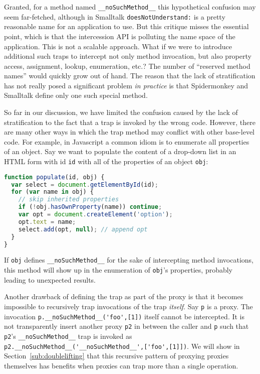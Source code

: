 \documentclass{acm_proc_article-sp}
\newcommand{\noSuchMethod}{\texttt{\_\_noSuchMethod\_\_}}
\begin{document}
Granted, for a method named \noSuchMethod{} this hypothetical confusion may seem far-fetched, although in Smalltalk \texttt{doesNotUnderstand:} is a pretty reasonable name for an application to use. But this critique misses the essential point, which is that the intercession API is polluting the name space of the application. This is not a scalable approach. What if we were to introduce additional such traps to intercept not only method invocation, but also property access, assignment, lookup, enumeration, etc.? The number of ``reserved method names'' would quickly grow out of hand. The reason that the lack of stratification has not really posed a significant problem \emph{in practice} is that Spidermonkey and Smalltalk define only one such special method.

So far in our discussion, we have limited the confusion caused by the lack of stratification to the fact that a trap is invoked by the wrong code. However, there are many other ways in which the trap method may conflict with other base-level code. For example, in Javascript a common idiom is to enumerate all properties of an object. Say we want to populate the content of a drop-down list in an HTML form with id \texttt{id} with all of the properties of an object \texttt{obj}:

\begin{lstlisting}[language=javascript]
function populate(id, obj) {
  var select = document.getElementById(id);
  for (var name in obj) {
    // skip inherited properties
    if (!obj.hasOwnProperty(name)) continue;
    var opt = document.createElement('option');
    opt.text = name;
    select.add(opt, null); // append opt
  }
}
\end{lstlisting}

If \texttt{obj} defines \noSuchMethod{} for the sake of intercepting method invocations, this method will show up in the enumeration of \texttt{obj}'s properties, probably leading to unexpected results.

Another drawback of defining the trap as part of the proxy is that it becomes impossible to recursively trap invocations of the trap \emph{itself}. Say \texttt{p} is a proxy. The invocation \lstinline{p.__noSuchMethod__('foo',[1])} itself cannot be intercepted. It is not transparently insert another proxy \texttt{p2} in between the caller and \texttt{p} such that \texttt{p2}'s \noSuchMethod{} trap is invoked as \lstinline{p2.__noSuchMethod__('__noSuchMethod__',['foo',[1]])}. We will show in Section~\ref{sub:doublelifting} that this recursive pattern of proxying proxies themselves has benefits when proxies can trap more than a single operation.
\end{document}
